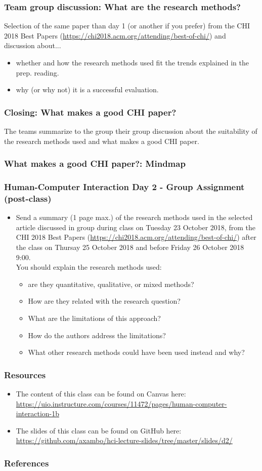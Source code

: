 \documentclass[screen, aspectratio=43]{beamer}
\begin{document}
%
\begin{frame}
\frametitle{Team group discussion: What are the research methods?}
Selection of the same paper than day 1 (or another if you prefer) from the CHI 2018 Best Papers (\url{https://chi2018.acm.org/attending/best-of-chi/}) and discussion about...
\begin{itemize}
\item whether and how the research methods used fit the trends explained in the prep. reading.
\item why (or why not) it is a successful evaluation.
\end{itemize}
\end{frame}
%
\begin{frame}
\frametitle{Closing: What makes a good CHI paper?}
The teams summarize to the group their group discussion about the suitability of the research methods used and what makes a good CHI paper.
\end{frame}
%
\begin{frame}
\frametitle{What makes a good CHI paper?: Mindmap}
\end{frame}
%
%
\begin{frame}
\frametitle{Human-Computer Interaction Day 2 - Group Assignment (post-class)}
\begin{itemize}
\item Send a summary (1 page max.) of the research methods used in the selected article discussed in group during class on Tuesday 23 October 2018, from the CHI 2018 Best Papers (\url{https://chi2018.acm.org/attending/best-of-chi/}) after the class on Thursay 25 October 2018 and before Friday 26 October 2018 9:00. \\
You should explain the research methods used:
\begin{itemize} 
\item are they quantitative, qualitative, or mixed methods? 
\item How are they related with the research question? 
\item What are the limitations of this approach? 
\item How do the authors address the limitations? 
\item What other research methods could have been used instead and why?
\end{itemize}
\end{itemize}
\end{frame}
%
\begin{frame}
\frametitle{Resources}
\begin{itemize}
\item The content of this class can be found on Canvas here:\\
\url{https://uio.instructure.com/courses/11472/pages/human-computer-interaction-1b}
\item The slides of this class can be found on GitHub here: \\
\url{https://github.com/axambo/hci-lecture-slides/tree/master/slides/d2/}
\end{itemize}
\end{frame}
%
\begin{frame}
  \frametitle{References}
  \printbibliography
\end{frame}
%
\end{document}
